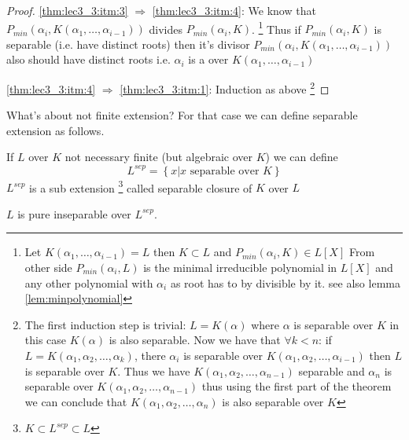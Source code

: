 \begin{theorem}
\begin{proof}
    \ref{thm:lec3_3:itm:3} $\Rightarrow$ \ref{thm:lec3_3:itm:4}:
    We know that
    $P_{min}\left(\alpha_i, K\left(\alpha_1, \dots,
    \alpha_{i-1}\right)\right)$ divides
    $P_{min}\left(\alpha_i, K\right)$.
    \footnote{
      Let $K\left(\alpha_1, \dots, \alpha_{i-1}\right) = L$
      then $K \subset L$ and
      $P_{min}\left(\alpha_i, K\right) \in L\left[ X \right]$
      From other side $P_{min}\left(\alpha_i, L\right)$ is the minimal
      irreducible polynomial  in $L\left[X\right]$ and any other
      polynomial with $\alpha_i$ as root has to by divisible by it.
      see also lemma \ref{lem:minpolynomial}
    }
    Thus if 
    $P_{min}\left(\alpha_i, K\right)$ is separable (i.e. have distinct
    roots) then it's divisor $P_{min}\left(\alpha_i, K\left(\alpha_1, \dots,
    \alpha_{i-1}\right)\right)$ also should have distinct roots i.e.
    $\alpha_i$ is a  over
    $K\left(\alpha_1, \dots,\alpha_{i-1}\right)$
    
    \ref{thm:lec3_3:itm:4} $\Rightarrow$ \ref{thm:lec3_3:itm:1}:
    Induction as above
    \footnote{
      The first induction step is trivial: $L=K\left(\alpha\right)$
      where $\alpha$ is separable over $K$ in this case
      $K\left(\alpha\right)$ is also separable.
      Now we have that $\forall k < n$:
      if $L = K\left(\alpha_1, \alpha_2, \dots, \alpha_k\right)$, there
      $\alpha_i$ is separable over
      $K\left(\alpha_1, \alpha_2, \dots, \alpha_{i-1}\right)$ then $L$
      is separable over $K$. Thus we have
      $K\left(\alpha_1, \alpha_2, \dots, \alpha_{n-1}\right)$
      separable and $\alpha_n$ is separable over $K\left(\alpha_1,
      \alpha_2, \dots, \alpha_{n-1}\right)$ thus using the first part
      of the theorem we can conclude that 
      $K\left(\alpha_1, \alpha_2, \dots, \alpha_{n}\right)$ is also
      separable over $K$
    }    
  \end{proof}
\end{theorem}

What's about not finite extension? For that case we can define
separable extension as follows.
\begin{definition}
  If $L$ over $K$ not necessary finite (but algebraic over $K$) we can
  define
  \[
  L^{sep} = \left\{x \vert x \mbox{ separable over } K \right\}
  \]
  $L^{sep}$ is a sub extension
  \footnote{
    $K \subset L^{sep} \subset L$
  }
  called separable closure of $K$ over
  $L$
  \label{def:separableclosure}
\end{definition}
$L$ is pure inseparable over $L^{sep}$.


